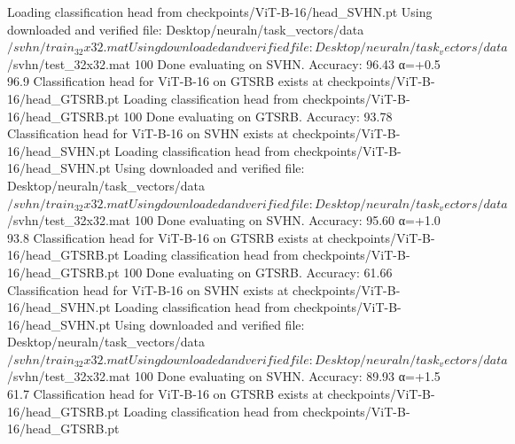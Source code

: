 Loading classification head from checkpoints/ViT-B-16/head_SVHN.pt
Using downloaded and verified file: Desktop/neuraln/task_vectors/data$/svhn/train_32x32.mat
Using downloaded and verified file: Desktop/neuraln/task_vectors/data$/svhn/test_32x32.mat
100%
Done evaluating on SVHN. Accuracy: 96.43%
  α=+0.5        96.9%
Classification head for ViT-B-16 on GTSRB exists at checkpoints/ViT-B-16/head_GTSRB.pt
Loading classification head from checkpoints/ViT-B-16/head_GTSRB.pt
100%
Done evaluating on GTSRB. Accuracy: 93.78%
Classification head for ViT-B-16 on SVHN exists at checkpoints/ViT-B-16/head_SVHN.pt
Loading classification head from checkpoints/ViT-B-16/head_SVHN.pt
Using downloaded and verified file: Desktop/neuraln/task_vectors/data$/svhn/train_32x32.mat
Using downloaded and verified file: Desktop/neuraln/task_vectors/data$/svhn/test_32x32.mat
100%
Done evaluating on SVHN. Accuracy: 95.60%
  α=+1.0        93.8%
Classification head for ViT-B-16 on GTSRB exists at checkpoints/ViT-B-16/head_GTSRB.pt
Loading classification head from checkpoints/ViT-B-16/head_GTSRB.pt
100%
Done evaluating on GTSRB. Accuracy: 61.66%
Classification head for ViT-B-16 on SVHN exists at checkpoints/ViT-B-16/head_SVHN.pt
Loading classification head from checkpoints/ViT-B-16/head_SVHN.pt
Using downloaded and verified file: Desktop/neuraln/task_vectors/data$/svhn/train_32x32.mat
Using downloaded and verified file: Desktop/neuraln/task_vectors/data$/svhn/test_32x32.mat
100%
Done evaluating on SVHN. Accuracy: 89.93%
  α=+1.5        61.7%
Classification head for ViT-B-16 on GTSRB exists at checkpoints/ViT-B-16/head_GTSRB.pt
Loading classification head from checkpoints/ViT-B-16/head_GTSRB.pt
